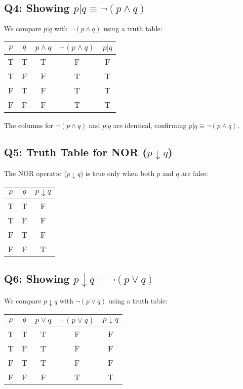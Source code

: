 \documentclass[12pt]{article}
\begin{document}
\subsection*{Q4: Showing $p | q \equiv \neg(p \wedge q)$}
We compare $p | q$ with $\neg(p \wedge q)$ using a truth table:

\begin{center}
\begin{tabular}{cc|ccc}
\toprule
$p$ & $q$ & $p \wedge q$ & $\neg(p \wedge q)$ & $p | q$ \\
\midrule
T & T & T & F & F \\
T & F & F & T & T \\
F & T & F & T & T \\
F & F & F & T & T \\
\bottomrule
\end{tabular}
\end{center}

The columns for $\neg(p \wedge q)$ and $p | q$ are identical, confirming $p | q \equiv \neg(p \wedge q)$.

\subsection*{Q5: Truth Table for NOR ($p \downarrow q$)}
The NOR operator ($p \downarrow q$) is true only when both $p$ and $q$ are false:

\begin{center}
\begin{tabular}{cc|c}
\toprule
$p$ & $q$ & $p \downarrow q$ \\
\midrule
T & T & F \\
T & F & F \\
F & T & F \\
F & F & T \\
\bottomrule
\end{tabular}
\end{center}

\subsection*{Q6: Showing $p \downarrow q \equiv \neg(p \vee q)$}
We compare $p \downarrow q$ with $\neg(p \vee q)$ using a truth table:

\begin{center}
\begin{tabular}{cc|ccc}
\toprule
$p$ & $q$ & $p \vee q$ & $\neg(p \vee q)$ & $p \downarrow q$ \\
\midrule
T & T & T & F & F \\
T & F & T & F & F \\
F & T & T & F & F \\
F & F & F & T & T \\
\bottomrule
\end{tabular}
\end{center}
\end{document}
